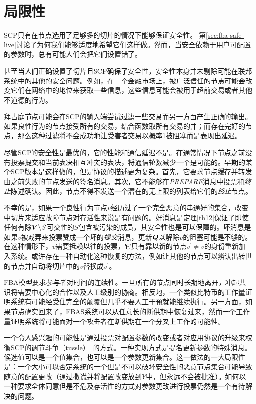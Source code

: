 \section{局限性}\label{sec:limit}

SCP只有在节点选用了足够多的{\quorum}切片的情况下能够保证安全性。	第\ref{sec:fba-safe-live}讨论了为何我们能够适度地希望它们这样做。然而，当安全依赖于用户可配置的参数时，总有可能人们会把它们设置错了。

甚至当人们正确设置了{\quorum}切片且SCP确保了安全性，安全性本身并未剔除可能在联邦系统中的其他的安全问题。例如，在一个金融市场上，被广泛信任的节点可能会改变它们在网络中的地位来获取一些信息，这些信息可能会被用于超前交易或者其他不道德的行为。

拜占庭节点可能会在SCP的输入端尝试过滤一些交易而另一方面产生正确的输出。如果良性行为的节点接受所有的交易，结合函数取所有交易的并；而存在完好的节点，那么这种过滤将不会成功地让受害者交易以概率1被阻塞而是表现出延迟。

尽管SCP的安全性是最优的，它的性能和通信延迟不是。在通常情况下节点之前没有投票提交和当前表决相互冲突的表决，将通信轮数减少一个是可能的。早期的某个SCP版本是这样做的，但是协议的描述更为复杂。首先，它要求节点缓存并转发由之前失败的节点发送的签名消息。其次，它不能够在\textsl{PREPARE}消息中投票和\textit{终止}陈述确认。因此，节点不得不发送一个潜在的无上限的列表给它们的\textit{终止}节点。

不幸的是，如果一个良性行为节点$v$经历过了一个完全恶意的串通好的{\vblock}集合，改变{\slot}中切片来适应故障节点对存活性来说是有问题的。好消息是定理\ref{th12}保证了即使任何有除${\bm V}\backslash S${\quorum}可交性的$S$包含被污染的成员，其安全性也是可以保障的。坏消息是如果$v$被戏弄来投票赞成一个坏的\textit{提交}消息，更新${\bm Q}$以解除$v$的阻塞可能是不够的。在这种情形下，$v$需要抵赖以往的投票，它只有靠以新的节点$v^{\prime}\neq v$的身份重新加入系统。或许存在一种自动化这种恢复的方法，例如让其他的节点可以辨认出转世的节点并自动将切片中的$v$替换成$v^{\prime}$。

FBA模型要求参与者对时间的连续性。一旦所有的节点同时长期地离开，冲起共识将需要中心化的合作以及人工级别的协商。相反地，一个类似比特币的工作量证明系统有可能经受住完全的颠覆但几乎不要人工干预就能继续执行。另一方面，如果节点确实回来了，FBAS系统可以从任意长的断供期中恢复过来，然而一个工作量证明系统将可能面对一个攻击者在断供期在一个分叉上工作的可能性。

一个令人感兴趣的可能性是通过投票对配置参数的改变或者对应用协议的升级来权衡SCP的调节斗争（tussle）~\cite{Clark:2005:TCD:1074047.1074049}的方式。一种实现方式是提名更新参数的特殊消息。候选值可以是一个值集合，也可以是一个参数更新集合。这一做法的一大局限性是：一个大小可以否定系统的一个{\quorum}但是不可以破坏安全性的恶意节点集合可能导致随意的配置更改（通过撒谎并将配置改变放到$Y$中，但永远不会被批准）。如何以一种要求全体{\quorum}同意但是不危及存活性的方式对参数更改进行投票仍然是一个有待解决的问题。